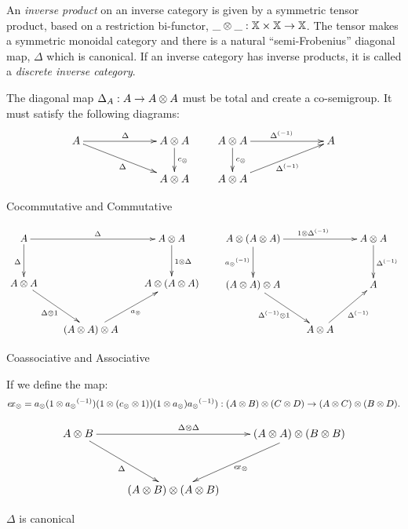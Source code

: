 \begin{definition}\label{def:inverse_product}
  An \emph{inverse product} on an inverse category \X is given by a symmetric tensor product, based
  on a restriction  bi-functor, $\_\otimes\_:\mathbb{X}\times\mathbb{X} \to \mathbb{X}$. The tensor makes \X a  symmetric
  monoidal category and there is a natural  ``semi-Frobenius'' diagonal map, $\Delta$ which is canonical.   If an
  inverse category has inverse products, it is called  a \emph{discrete inverse category}.


  The diagonal map $\Delta_A:A \to A\otimes A$ must be total and create a co-semigroup. It
  must satisfy the following diagrams:
  \[
    \xymatrix @!0 @C=90pt @R=35pt{
      A \ar[dr]_{\Delta} \ar[r]^{\Delta} &
      A \* A \ar[d]^{c_{\*}}\\
      & A \* A
    }\qquad
    \xymatrix @!0 @C=90pt @R=35pt{
      A \* A \ar[d]^{c_{\*}} \ar[r]^{\inv{\Delta}}  & A\\
      A \* A  \ar[ur]_{\inv{\Delta}}
    }
  \]
\begin{center}Cocommutative and Commutative\end{center}

  \[
    \xymatrix @C=20pt @R=30pt{
      A \ar[rr]^{\Delta} \ar[d]_{\Delta} & &
      A \* A \ar[d]^{1\*\Delta}\\
      A\*A \ar[dr]_{\Delta \* 1}& &
      A \* ( A \* A) \\
      &   (A \* A) \* A \ar[ur]_{a_{\*}}
    }\qquad
    \xymatrix @C=20pt @R=30pt{
      A\*(A\*A) \ar[rr]^{1\*\idelta} \ar[d]_{\inv{a_\*}} && A\*A \ar[d]^{\idelta}\\
      (A\*A)\*A \ar[dr]_{\idelta\*1}&&A\\
     & A\*A \ar[ur]_{\idelta}
    }
  \]
\begin{center}Coassociative and Associative\end{center}
If we define the map:
  \[
    e\!x_{\otimes} =  a_{\otimes}(1\otimes{a_{\otimes}}^{(-1)})(1\otimes(c_{\otimes}\otimes1))(1\otimes a_{\otimes}){a_{\otimes}}^{(-1)}): (A\otimes B)\otimes(C\otimes D) \to (A\otimes C) \otimes (B\otimes D).
  \]

  \[
    \xymatrix @C=25pt @R=35pt{
      A \* B \ar[dr]_{\Delta}
      \ar[rr]^{\Delta \* \Delta} && (A \* A) \* (B \* B) \ar[dl]^{\excs}\\
      &(A \* B) \* (A \* B)
    }
  \]
\begin{center}$\Delta$ is canonical\end{center}


\end{definition}
